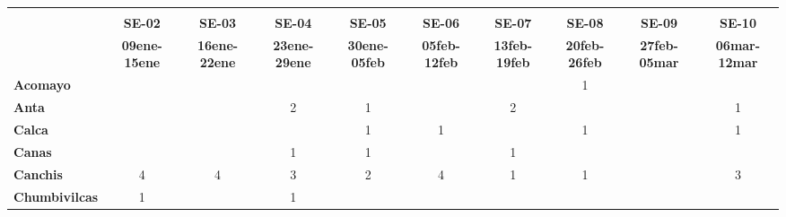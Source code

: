 \begin{tabular}{lccccccccc}
	\textbf{}              	  & \multicolumn{1}{l}{}                        & \multicolumn{1}{l}{}      & \multicolumn{1}{l}{}                         & \multicolumn{1}{l}{}                         & \multicolumn{1}{l}{}                         & \multicolumn{1}{l}{}                        & \multicolumn{1}{l}{}                         & \multicolumn{1}{l}{}                         & \multicolumn{1}{l}{}     \\
	\textbf{}                                                                               
	&\textbf{SE-02}								&\textbf{SE-03}
	&\textbf{SE-04}								&\textbf{SE-05}	
	&\textbf{SE-06}								&\textbf{SE-07}				&\textbf{SE-08}
	&\textbf{SE-09}								&\textbf{SE-10}\\
	\textbf{}              	  	
	&\textbf{09ene-15ene}						&\textbf{16ene-22ene}				&\textbf{23ene-29ene}						&\textbf{30ene-05feb}
	&\textbf{05feb-12feb}						&\textbf{13feb-19feb}
	&\textbf{20feb-26feb}						&\textbf{27feb-05mar}
	&\textbf{06mar-12mar}\\
	\textbf{Acomayo}                        	
	&\cellcolor[HTML]{FCC46C} 	    			&\cellcolor[HTML]{FCC46C}				    &\cellcolor[HTML]{FCC46C}
	&\cellcolor[HTML]{FCC46C}					&\cellcolor[HTML]{FCC46C}
	&\cellcolor[HTML]{FCC46C}					&1
	&\cellcolor[HTML]{FCC46C}					&\cellcolor[HTML]{FCC46C} \\
	\textbf{Anta}                                                          					
	&\cellcolor[HTML]{FCC46C}					&\cellcolor[HTML]{FCC46C}					&2 				
	&1											&\cellcolor[HTML]{FCC46C}					&2
	&\cellcolor[HTML]{FCC46C}					&\cellcolor[HTML]{FCC46C}					&1\\
	\textbf{Calca}      				       								            
	&\cellcolor[HTML]{FCC46C}					&\cellcolor[HTML]{FCC46C}					&\cellcolor[HTML]{FCC46C}
	&1 											&1	
	&\cellcolor[HTML]{FCC46C}					&1											&\cellcolor[HTML]{FCC46C} 				&1\\                										
	\textbf{Canas}                              
	&\cellcolor[HTML]{FCC46C} 		
	&\cellcolor[HTML]{FCC46C}					&1
	&1											&\cellcolor[HTML]{FCC46C}
	&1											&\cellcolor[HTML]{FCC46C}
	&\cellcolor[HTML]{FCC46C}					&\cellcolor[HTML]{FCC46C}\\
	\textbf{Canchis}                             		
	&4
	&4											&3
	&2											&4
	&1											&1
	&\cellcolor[HTML]{FCC46C}					&3\\
	\textbf{Chumbivilcas}                      			
	&1
	&\cellcolor[HTML]{FCC46C} 					&1

\end{tabular}
